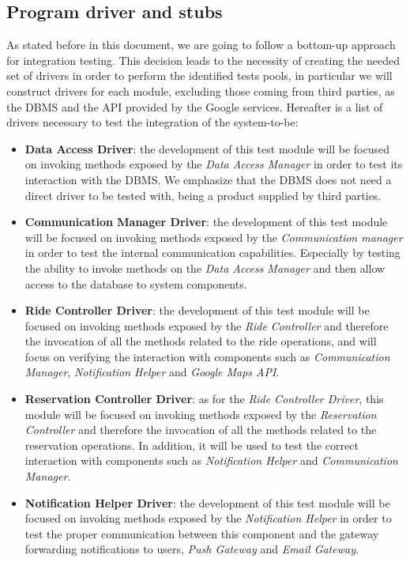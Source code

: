 \documentclass[10pt, a4paper,titlepage]{article}
\begin{document}
\subsection{Program driver and stubs}
As stated before in this document, we are going to follow a bottom-up approach for integration testing. This decision leads to the necessity of creating the needed set of drivers in order to perform the identified tests pools, in particular we will construct drivers for each module, excluding those coming from third parties, as the DBMS and the API provided by the Google services. Hereafter is a list of drivers necessary to test the integration of the system-to-be:
\begin{itemize}
\item \textbf{Data Access Driver}: the development of this test module will be focused on invoking methods exposed by the \emph{Data Access Manager} in order to test its interaction with the DBMS. We emphasize that the DBMS does not need a direct driver to be tested with, being a product supplied by third parties.
\item \textbf{Communication Manager Driver}: the development of this test module will be focused on invoking methods exposed by the \emph{Communication manager} in order to test the internal communication capabilities. Especially by testing the ability to invoke methods on the \emph{Data Access Manager} and then allow access to the database to system components.
\item \textbf{Ride Controller Driver}: the development of this test module will be focused on invoking methods exposed by the \emph{Ride Controller} and therefore the invocation of all the methods related to the ride operations, and will focus on verifying the interaction with components such as \emph{Communication Manager}, \emph{Notification Helper} and \emph{Google Maps API}.
\item \textbf{Reservation Controller Driver}: as for the \emph{Ride Controller Driver}, this module will be focused on invoking methods exposed by the \emph{Reservation Controller} and therefore the invocation of all the methods related to the reservation operations. In addition, it will be used to test the correct interaction with components such as \emph{Notification Helper} and \emph{Communication Manager}.
\item \textbf{Notification Helper Driver}: the development of this test module will be focused on invoking methods exposed by the \emph{Notification Helper} in order to test the proper communication between this component and the gateway forwarding notifications to users, \emph{Push Gateway} and \emph{Email Gateway}.

\end{itemize}
\end{document}
